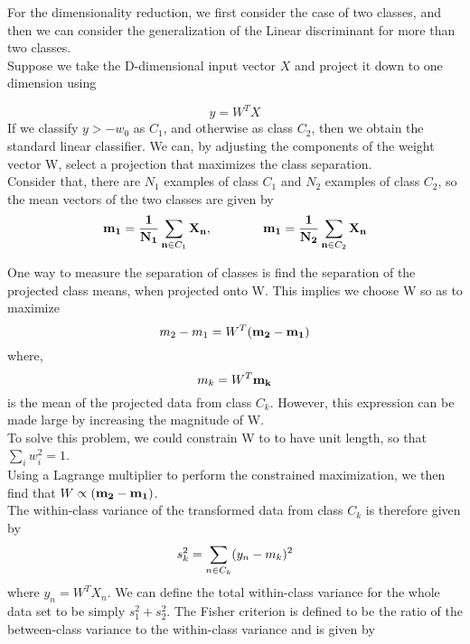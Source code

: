 \documentclass[12pt, letterpaper]{article}
\begin{document}
For the dimensionality reduction, we first consider the case of two classes, and then we can consider the generalization of the Linear discriminant for more than two classes.\\
Suppose we take the D-dimensional input vector \(X\) and project it down to one dimension using 

\[y = W^TX\] If we classify \(y > -w_0\) as \emph{\(C_1\)}, and otherwise as class \emph{\(C_2\)}, then we obtain the standard linear classifier. 
We can, by adjusting the components of the weight vector W, select a projection that maximizes the class separation.\\
Consider that, there are \emph{\(N_1\)} examples of class \emph{\(C_1\)} and \emph{\(N_2\)} examples of class \emph{\(C_2\)}, so the mean vectors of the two classes are given by
\[ \bf{m_1} = \frac{1}{N_1} \sum_{n\in\emph{\(C_1\)}}X_n, \qquad\qquad \bf{m_1} = \frac{1}{N_2} \sum_{n\in\emph{\(C_2\)} }X_n \]

One way to measure the separation of classes is find the separation of the projected class means, when projected onto W. This implies we choose W so as to maximize 
\[m_2 - m_1 = W^T(\bf{m_2 -m_1})\]
where, 
\[m_k = W^T\bf{m_k}\]
is the mean of the projected data from class \emph{\(C_k\)}. However, this expression can be made large by increasing the magnitude of W.\\ To solve this problem, we could constrain W to to have unit length, so that \(\sum_{i} w_i^2 = 1\). \\
Using a Lagrange multiplier to perform the constrained maximization, we then find that \( W \propto (\bf{m_2 - m_1 })\).\\
The within-class variance of the transformed data from class \emph{\(C_k\)} is therefore given by 
\[s_k^2 = \sum_{n \in \emph{\(C_k\)}} (y_n - m_k)^2\]
where \(y_n = W^TX_n\). We can define the total within-class variance for the whole data set to be simply \(s_1^2 + s_2^2\). 
The Fisher criterion is defined to be the ratio of the between-class variance to the within-class variance and is given by 
\end{document}
